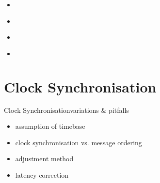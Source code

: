 \documentclass{beamer}
\begin{document}
\begin{frame}{}%
\begin{center}
\begin{itemize}
  \item \begin{large}\end{large}
 \item \begin{large}\end{large}
 \item \begin{large}\end{large}
 \item \begin{large}\end{large}
\end{itemize}
\end{center}
\end{frame}


\section{Clock Synchronisation}
\begin{frame}{Clock Synchronisation}{variations \& pitfalls}
\begin{center}
\begin{itemize}
  \item \begin{large}assumption of timebase\end{large}
 \item \begin{large}clock synchronisation vs. message ordering\end{large}
 \item \begin{large}adjustment method\end{large}
 \item \begin{large}latency correction\end{large}
\end{itemize}
\end{center}
\end{frame}
\end{document}
